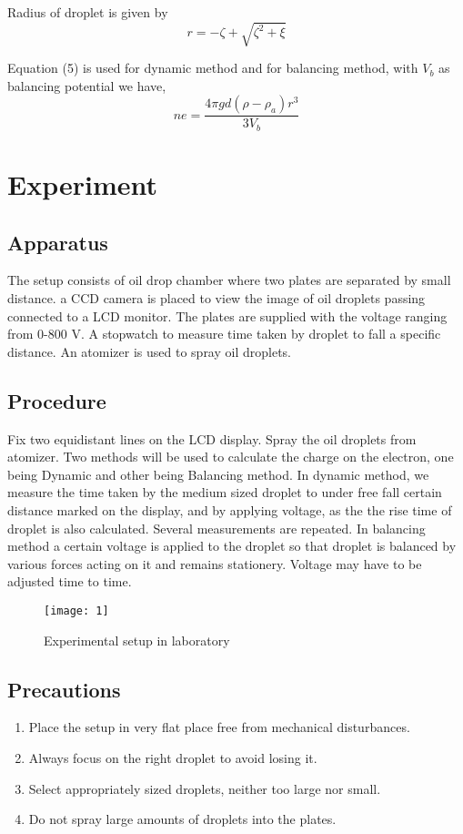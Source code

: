 \documentclass[a4paper, amsfonts, amssymb, amsmath, reprint, showkeys, nofootinbib, twoside]{revtex4-1}
\begin{document}
Radius of droplet is given by
\begin{equation}
	r=-\zeta+\sqrt{\zeta^2+\xi}
\end{equation}

Equation (5) is used for dynamic method and for balancing method, with $V_b$ as balancing potential  we have,
\begin{equation}
	ne=\frac{4\pi gd(\rho-\rho_a)r^3}{3V_b}
\end{equation}

\section{Experiment}
\subsection{Apparatus}
The setup consists of oil drop chamber where two plates are separated by small distance. a CCD camera is placed to view the image of oil droplets passing connected to a LCD monitor. The plates are supplied with the voltage ranging from 0-800 V. A stopwatch to measure time taken by droplet to fall a specific distance. An atomizer is used to spray oil droplets.

\subsection{Procedure}
Fix two equidistant lines on the LCD display. Spray the oil droplets from atomizer. Two methods will be used to calculate the charge on the electron, one being Dynamic and other being Balancing method. In dynamic method, we measure the time taken by the medium sized droplet to under free fall certain distance marked on the display, and by applying voltage, as the the rise time of droplet is also calculated. Several measurements are repeated. In balancing method a certain voltage is applied to the droplet so that droplet is balanced by various forces acting on it and remains stationery. Voltage may have to be adjusted time to time.

\begin{figure}[H] %
	\centering
	\texttt{[image: 1]} 
	\caption{Experimental setup in laboratory}
	\label{1}
\end{figure}

\subsection{Precautions}
\begin{enumerate}
	\item {Place the setup in very flat place free from mechanical disturbances.}
	\item {Always focus on the right droplet to avoid losing it.}
	\item{Select appropriately sized droplets, neither too large nor small.}
	\item{Do not spray large amounts of droplets into the plates. }
\end{enumerate}
\end{document}

